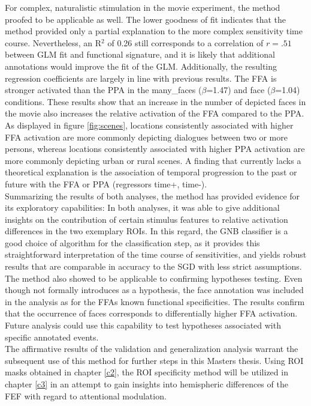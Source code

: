 \documentclass[a4paper, 12pt]{scrreprt}
\begin{document}
For complex, naturalistic stimulation in the movie experiment, the method proofed to be applicable as well. The lower goodness of fit indicates that the method provided only a partial explanation to the more complex sensitivity time course. Nevertheless, an R$^2$ of 0.26 still corresponds to a correlation of $r = .51$ between GLM fit and functional signature, and it is likely that additional annotations would improve the fit of the GLM. Additionally, the resulting regression coefficients are largely in line with previous results. The FFA is stronger activated than the PPA in the many\_faces ($\beta$=1.47) and face ($\beta$=1.04) conditions. These results show that an increase in the number of depicted faces in the movie also increases the relative activation of the FFA compared to the PPA. As displayed in figure \ref{fig:scenes}, locations consistently associated with higher FFA activation are more commonly depicting dialogues between two or more persons, whereas locations consistently associated with higher PPA activation are more commonly depicting urban or rural scenes. A finding that currently lacks a theoretical explanation is the association of temporal progression to the past or future with the FFA or PPA (regressors time+, time-).\\
Summarizing the results of both analyses, the method has provided evidence for its exploratory capabilities: In both analyses, it was able to give additional insights on the contribution of certain stimulus features to relative activation differences in the two exemplary ROIs. In this regard, the GNB classifier is a good choice of algorithm for the classification step, as it provides this straightforward interpretation of the time course of sensitivities, and yields robust results that are comparable in accuracy to the SGD with less strict assumptions. The method also showed to be applicable to confirming hypotheses testing. Even though not formally introduces as a hypothesis, the face annotation was included in the analysis as for the FFAs known functional specificities. The results confirm that the occurrence of faces corresponds to differentially higher FFA activation. Future analysis could use this capability to test hypotheses associated with specific annotated events. \\ 
The affirmative results of the validation and generalization analysis warrant the subsequent use of this method for further steps in this Masters thesis. Using ROI masks obtained in chapter \ref{c2}, the ROI specificity method will be utilized in chapter \ref{c3} in an attempt to gain insights into hemispheric differences of the FEF with regard to attentional modulation. \\
\end{document}
